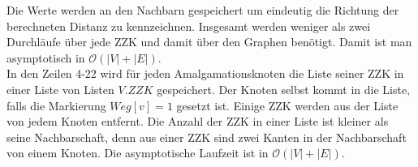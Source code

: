 Die Werte werden an den Nachbarn gespeichert um eindeutig die Richtung der berechneten Distanz zu kennzeichnen. Insgesamt werden weniger als zwei Durchläufe über jede ZZK und damit über den Graphen benötigt. Damit ist man asymptotisch in $\mathcal{O}(|V|+|E|)$.\\
In den Zeilen 4-22 wird für jeden Amalgamationsknoten die Liste seiner ZZK in einer Liste von Listen $V.ZZK$ gespeichert. Der Knoten selbst kommt in die Liste, falls die Markierung $Weg[v]=1$ gesetzt ist. Einige ZZK werden aus der Liste von jedem Knoten entfernt. Die Anzahl der ZZK in einer Liste ist kleiner als seine Nachbarschaft, denn aus einer ZZK sind zwei Kanten in der Nachbarschaft von einem Knoten. Die asymptotische Laufzeit ist in $\mathcal{O}(|V|+|E|)$.
\begin{algorithm}
\caption{$K(x)$}
\begin{algorithmic}[1]
\vspace{2mm} 
\ENDIF
\vspace{2mm}
\end{algorithmic}
\label{algberechnungkreis}
\end{algorithm}
~\linebreak

